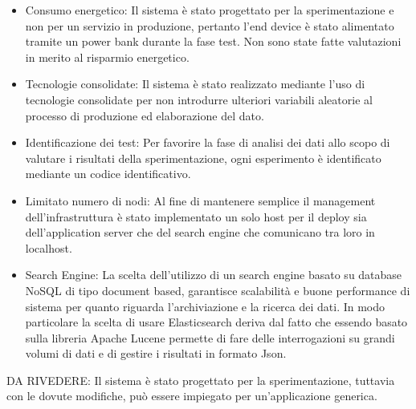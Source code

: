 \documentclass[12pt,a4paper,openright,twoside]{report}
\begin{document}
\begin{itemize}
\item Consumo energetico: Il sistema \`e stato progettato per la sperimentazione e non per un servizio in produzione, pertanto l'end device \`e stato alimentato tramite un power bank durante la fase test. Non sono state fatte valutazioni in merito al risparmio energetico.
\item Tecnologie consolidate: Il sistema \`e stato realizzato mediante l'uso di tecnologie consolidate per non introdurre ulteriori variabili aleatorie al processo di produzione ed elaborazione del dato. 
\item Identificazione dei test: Per favorire la fase di analisi dei dati allo scopo di valutare i risultati della sperimentazione, ogni esperimento \`e identificato mediante un codice identificativo. 
\item Limitato numero di nodi: Al fine di mantenere semplice il management dell'infrastruttura \`e stato implementato un solo host per il deploy sia dell'application server che del search engine che comunicano tra loro in localhost.   
\item Search Engine: La scelta dell'utilizzo di un search engine basato su database NoSQL di tipo document based, garantisce scalabilità e buone performance di sistema per quanto riguarda l'archiviazione e la ricerca dei dati. In modo particolare la scelta di usare Elasticsearch deriva dal fatto che essendo basato sulla libreria Apache Lucene permette di fare delle interrogazioni su grandi volumi di dati e di gestire i risultati in formato Json.
\end{itemize}
DA RIVEDERE: Il sistema \`e stato progettato per la sperimentazione, tuttavia con le dovute modifiche,  pu\`o essere impiegato per un'applicazione generica.   



 
\end{document}
